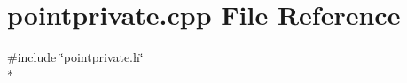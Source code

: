 \section{pointprivate.\+cpp File Reference}
\label{curve_2pointprivate_8cpp}
{\ttfamily \#include \char`\"{}pointprivate.\+h\char`\"{}}\\*
